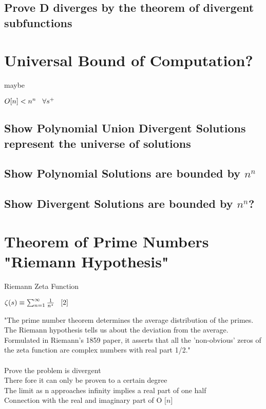 \documentclass[11pt]{article}
\begin{document}
\subsection{Prove D diverges by the theorem of divergent subfunctions}




\newpage
\section{Universal Bound of Computation?}
maybe
\begin{center}
$
O[n] < n^n \hspace{3mm} \forall s^+
$
\end{center}

\subsection{Show Polynomial Union Divergent Solutions represent the universe of solutions}
\subsection{Show Polynomial Solutions are bounded by $n^n$}
\subsection{Show Divergent Solutions are bounded by $n^n$?}









\newpage
\section{Theorem of Prime Numbers "Riemann Hypothesis"}
Riemann Zeta Function
\begin{center}
$
\zeta (s) \equiv \sum_{n=1}^{\infty} \frac{1}{n^s} \hspace{3mm} \lbrack 2 \rbrack
$
\end{center}
"The prime number theorem determines the average distribution of the primes. The Riemann hypothesis tells us about the deviation from the average. Formulated in Riemann's 1859 paper, it asserts that all the 'non-obvious' zeros of the zeta function are complex numbers with real part 1/2." \rbrack\\
\\
Prove the problem is divergent\\
There fore it can only be proven to a certain degree\\
The limit as n approaches infinity implies a real part of one half\\
Connection with the real and imaginary part of O $\lbrack n \rbrack$
\end{document}
